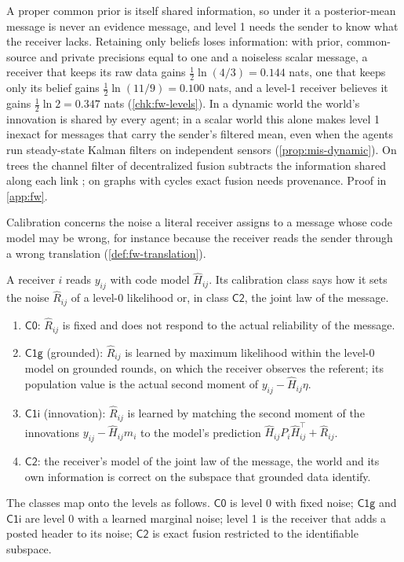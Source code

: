 A proper common prior is itself shared information, so under it a posterior-mean message is never an evidence message, and level 1 needs the sender to know what the receiver lacks. Retaining only beliefs loses information: with prior, common-source and private precisions equal to one and a noiseless scalar message, a receiver that keeps its raw data gains $\tfrac12\ln(4/3)=0.144$ nats, one that keeps only its belief gains $\tfrac12\ln(11/9)=0.100$ nats, and a level-1 receiver believes it gains $\tfrac12\ln2=0.347$ nats (\cref{chk:fw-levels}). In a dynamic world the world's innovation is shared by every agent; in a scalar world this alone makes level 1 inexact for messages that carry the sender's filtered mean, even when the agents run steady-state Kalman filters on independent sensors (\cref{prop:mis-dynamic}). On trees the channel filter of decentralized fusion subtracts the information shared along each link \citep{grime1994data}; on graphs with cycles exact fusion needs provenance. Proof in \cref{app:fw}.

Calibration concerns the noise a literal receiver assigns to a message whose code model may be wrong, for instance because the receiver reads the sender through a wrong translation (\cref{def:fw-translation}).

\begin{definition}\label{def:fw-calibration}
A receiver $i$ reads $y_{ij}$ with code model $\hat H_{ij}$. Its calibration class says how it sets the noise $\hat R_{ij}$ of a level-0 likelihood or, in class $\mathsf{C2}$, the joint law of the message.
\begin{enumerate}
\item[] $\mathsf{C0}$: $\hat R_{ij}$ is fixed and does not respond to the actual reliability of the message.
\item[] $\mathsf{C1g}$ (grounded): $\hat R_{ij}$ is learned by maximum likelihood within the level-0 model on grounded rounds, on which the receiver observes the referent; its population value is the actual second moment of $y_{ij}-\hat H_{ij}\eta$.
\item[] $\mathsf{C1i}$ (innovation): $\hat R_{ij}$ is learned by matching the second moment of the innovations $y_{ij}-\hat H_{ij}m_i$ to the model's prediction $\hat H_{ij}P_i\hat H_{ij}^\top+\hat R_{ij}$.
\item[] $\mathsf{C2}$: the receiver's model of the joint law of the message, the world and its own information is correct on the subspace that grounded data identify.
\end{enumerate}
The classes map onto the levels as follows. $\mathsf{C0}$ is level 0 with fixed noise; $\mathsf{C1g}$ and $\mathsf{C1i}$ are level 0 with a learned marginal noise; level 1 is the receiver that adds a posted header to its noise; $\mathsf{C2}$ is exact fusion restricted to the identifiable subspace.
\end{definition}

